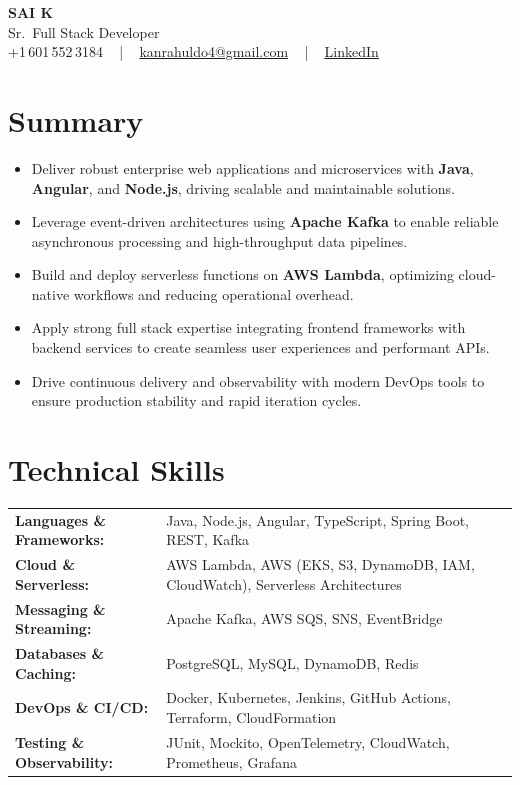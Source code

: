 \documentclass[letterpaper,11pt]{article}
\newcommand{\resumeItem}[1]{
  \item\footnotesize{
    {#1 \vspace{-2pt}}
  }
}
\newcommand{\resumeItemListStart}{\begin{itemize}[leftmargin=*]}
\newcommand{\resumeItemListEnd}{\end{itemize}\vspace{-5pt}}
\begin{document}
\begin{center}
    {\fontsize{14pt}{12pt}\selectfont \textbf{\MakeUppercase{Sai K}}}\\ \vspace{2pt}
    \fontsize{10pt}{12pt}\selectfont Sr.\ Full Stack Developer\\ \vspace{2pt}
    \fontsize{10pt}{12pt}\selectfont +1\,601\,552\,3184 ~ | ~
    \href{mailto:kanrahuldo4@gmail.com}{kanrahuldo4@gmail.com} ~ | ~
    \href{https://www.linkedin.com/in/srrrk/}{\color{blue}\underline{LinkedIn}}
    \vspace{-10pt}
\end{center}

\section{Summary}
\fontsize{9pt}{10pt}\selectfont
\resumeItemListStart
  \resumeItem{Deliver robust enterprise web applications and microservices with \textbf{Java}, \textbf{Angular}, and \textbf{Node.js}, driving scalable and maintainable solutions.}
  \resumeItem{Leverage event-driven architectures using \textbf{Apache Kafka} to enable reliable asynchronous processing and high-throughput data pipelines.}
  \resumeItem{Build and deploy serverless functions on \textbf{AWS Lambda}, optimizing cloud-native workflows and reducing operational overhead.}
  \resumeItem{Apply strong full stack expertise integrating frontend frameworks with backend services to create seamless user experiences and performant APIs.}
  \resumeItem{Drive continuous delivery and observability with modern DevOps tools to ensure production stability and rapid iteration cycles.}
\resumeItemListEnd
\vspace{-6pt}

\section{Technical Skills}
\vspace{-14pt}
\begin{table}[h]
\fontsize{9pt}{10pt}\selectfont
\begin{tabular}{p{0.3\linewidth} p{0.7\linewidth}}
\textbf{Languages \& Frameworks:} & Java, Node.js, Angular, TypeScript, Spring Boot, REST, Kafka \\
\textbf{Cloud \& Serverless:} & AWS Lambda, AWS (EKS, S3, DynamoDB, IAM, CloudWatch), Serverless Architectures \\
\textbf{Messaging \& Streaming:} & Apache Kafka, AWS SQS, SNS, EventBridge \\
\textbf{Databases \& Caching:} & PostgreSQL, MySQL, DynamoDB, Redis \\
\textbf{DevOps \& CI/CD:} & Docker, Kubernetes, Jenkins, GitHub Actions, Terraform, CloudFormation \\
\textbf{Testing \& Observability:} & JUnit, Mockito, OpenTelemetry, CloudWatch, Prometheus, Grafana \\
\end{tabular}
\end{table}
\vspace{-15pt}
\end{document}
